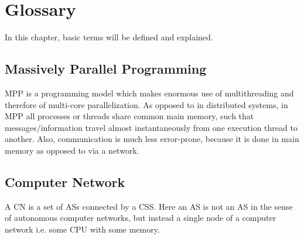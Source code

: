 \section{Glossary}

In this chapter, basic terms will be defined and explained.

\subsection{Massively Parallel Programming}

\acf{MPP} is a programming model which makes enormous use of multithreading and therefore of multi-core parallelization. As opposed to in distributed systems, in \ac{MPP} all processes or threads share common main memory, such that messages/information travel almost instantaneously from one execution thread to another. Also, communication is much less error-prone, because it is done in main memory as opposed to via a network.

\subsection{Computer Network}

A \ac{CN} is a set of \acp{AS} connected by a \ac{CSS}. Here an \ac{AS} is not an \ac{AS} in the sense of autonomous computer networks, but instead a single node of a computer network i.e. some CPU with some memory.